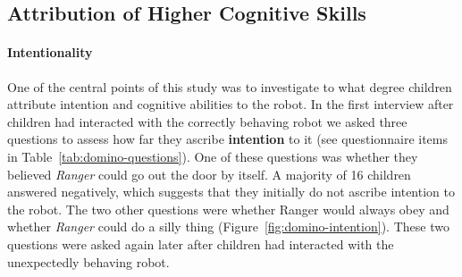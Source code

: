 \documentclass[letterpaper, 10pt, conference]{ieeeconf}
\begin{document}


\subsection{Attribution of Higher Cognitive Skills}
\label{higher_cognition}

\paragraph{Intentionality}

One of the central points of this study was to investigate to what degree
children attribute intention and cognitive abilities to the robot.  In the first
interview after children had interacted with the correctly behaving robot we
asked three questions to assess how far they ascribe \textbf{intention} to it
(see questionnaire items in Table~\ref{tab:domino-questions}). One of these
questions was whether they believed \emph{Ranger} could go out the door by
itself. A majority of 16 children answered negatively, which suggests that
they initially do not ascribe intention to the robot. The two other questions
were whether Ranger would always obey and whether \emph{Ranger} could do a silly
thing (Figure~\ref{fig:domino-intention}). These two questions were asked again
later after children had interacted with the unexpectedly behaving robot.

\end{document}
